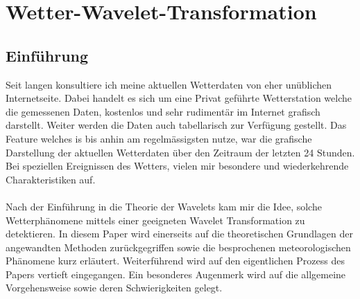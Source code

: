 %
%
%
\chapter{Wetter-Wavelet-Transformation\label{chapter:wwt}}
\begin{refsection}




\lstset{style=mystyle}


\section{Einführung}


Seit langen konsultiere ich meine aktuellen Wetterdaten von eher unüblichen Internetseite.
Dabei handelt es sich um eine Privat geführte Wetterstation welche die gemessenen Daten, kostenlos und sehr rudimentär im Internet grafisch darstellt.
Weiter werden die Daten auch tabellarisch zur Verfügung gestellt.
Das Feature welches is bis anhin am regelmässigsten nutze, war die grafische Darstellung der aktuellen Wetterdaten über den Zeitraum der letzten 24 Stunden.
Bei speziellen Ereignissen des Wetters, vielen mir besondere und wiederkehrende Charakteristiken auf.
\\
\\
Nach der Einführung in die Theorie der Wavelets kam mir die Idee, solche Wetterphänomene mittels einer geeigneten Wavelet Transformation zu detektieren.
In diesem Paper wird einerseits auf die theoretischen Grundlagen der angewandten Methoden zurückgegriffen sowie die besprochenen meteorologischen Phänomene kurz erläutert. 
Weiterführend wird auf den eigentlichen Prozess des Papers vertieft eingegangen.
Ein besonderes Augenmerk wird auf die allgemeine Vorgehensweise sowie deren Schwierigkeiten gelegt.
\\





\end{refsection}

